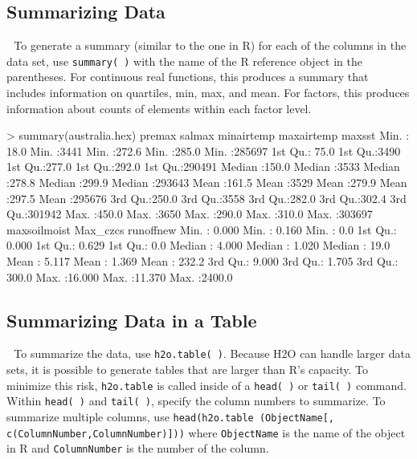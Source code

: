\documentclass[11pt]{article}
\begin{document}
\begin{enumerate}


\subsection{Summarizing Data} 
To generate a summary (similar to the one in R) for each of the columns in the data set, use {\texttt{summary( )}} with the name of the R reference object in the parentheses. 
For continuous real functions, this produces a summary that includes information on quartiles, min, max, and mean. 
For factors, this produces information about counts of elements within each factor level. 

\begin{spverbatim}

> summary(australia.hex)
 premax          salmax         minairtemp      maxairtemp      maxsst          
 Min.   : 18.0   Min.   :3441   Min.   :272.6   Min.   :285.0   Min.   :285697  
 1st Qu.: 75.0   1st Qu.:3490   1st Qu.:277.0   1st Qu.:292.0   1st Qu.:290491  
 Median :150.0   Median :3533   Median :278.8   Median :299.9   Median :293643  
 Mean   :161.5   Mean   :3529   Mean   :279.9   Mean   :297.5   Mean   :295676  
 3rd Qu.:250.0   3rd Qu.:3558   3rd Qu.:282.0   3rd Qu.:302.4   3rd Qu.:301942  
 Max.   :450.0   Max.   :3650   Max.   :290.0   Max.   :310.0   Max.   :303697  
 maxsoilmoist     Max_czcs         runoffnew       
 Min.   : 0.000   Min.   : 0.160   Min.   :   0.0  
 1st Qu.: 0.000   1st Qu.: 0.629   1st Qu.:   0.0  
 Median : 4.000   Median : 1.020   Median :  19.0  
 Mean   : 5.117   Mean   : 1.369   Mean   : 232.2  
 3rd Qu.: 9.000   3rd Qu.: 1.705   3rd Qu.: 300.0  
 Max.   :16.000   Max.   :11.370   Max.   :2400.0  
\end{spverbatim}


\subsection{Summarizing Data in a Table} 
To summarize the data, use {\texttt{h2o.table( )}}. Because H2O can handle larger data sets, it is possible to generate tables that are larger than R’s capacity. To minimize this risk, {\texttt{h2o.table}} is called inside of a {\texttt{head( )}} or {\texttt{tail( )}} command. Within {\texttt{head( )}}  and {\texttt{tail( )}}, specify the column numbers to summarize. 
To summarize multiple columns, use {\texttt{head(h2o.table (ObjectName[, c(ColumnNumber,ColumnNumber)]))}} where {\texttt{ObjectName}} is the name of the object in R and {\texttt{ColumnNumber}} is the number of the column. 


\end{enumerate}
\end{document}
